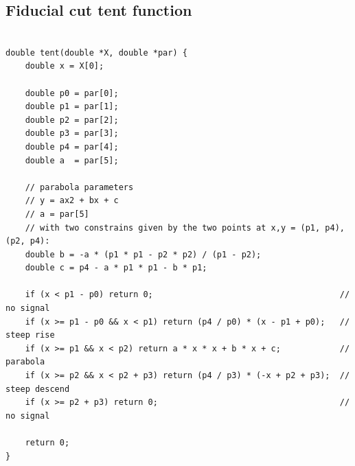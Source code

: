 \subsection{ Fiducial cut tent function}\label{sec:p_tent_function}

\begin{verbatim}

double tent(double *X, double *par) {
    double x = X[0];

    double p0 = par[0];
    double p1 = par[1];
    double p2 = par[2];
    double p3 = par[3];
    double p4 = par[4];
    double a  = par[5];

    // parabola parameters
    // y = ax2 + bx + c
    // a = par[5]
    // with two constrains given by the two points at x,y = (p1, p4), (p2, p4):
    double b = -a * (p1 * p1 - p2 * p2) / (p1 - p2);
    double c = p4 - a * p1 * p1 - b * p1;

    if (x < p1 - p0) return 0;                                      // no signal
    if (x >= p1 - p0 && x < p1) return (p4 / p0) * (x - p1 + p0);   // steep rise
    if (x >= p1 && x < p2) return a * x * x + b * x + c;            // parabola
    if (x >= p2 && x < p2 + p3) return (p4 / p3) * (-x + p2 + p3);  // steep descend
    if (x >= p2 + p3) return 0;                                     // no signal

    return 0;
}

\end{verbatim}

